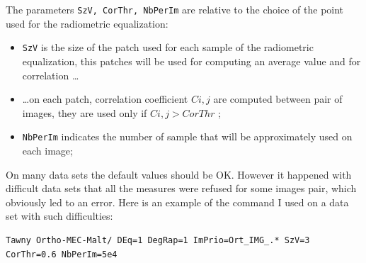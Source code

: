 The parameters {\tt SzV, CorThr, NbPerIm} are relative to the choice of the point
used for the radiometric equalization:


\begin{itemize}
   \item {\tt SzV} is the size of the patch used for each sample of the radiometric equalization,
         this patches will be used for computing an average value and for correlation  \dots

   \item  \dots on each patch, correlation coefficient  $C{i,j}$ are computed between pair
          of images, they are used only if  $C{i,j} > CorThr$ ;

   \item {\tt NbPerIm} indicates the number of sample that will be approximately used on each image;

\end{itemize}


On many data sets the default values should be OK. However it happened with difficult data
sets that all the measures were refused for some images pair, which obviously led to an error.
Here is an example of the command I used on a data set with such difficulties:


\begin{verbatim}
Tawny Ortho-MEC-Malt/ DEq=1 DegRap=1 ImPrio=Ort_IMG_.* SzV=3 CorThr=0.6 NbPerIm=5e4
\end{verbatim}

